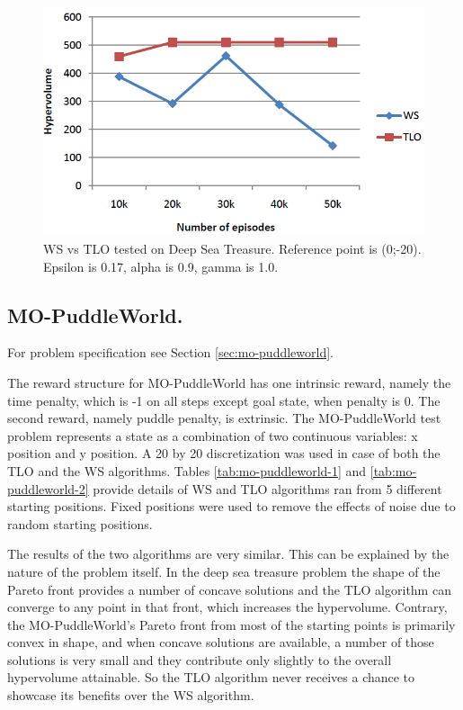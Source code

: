 \begin{figure}[ht]
\centering
\includegraphics[scale=0.6]{DSTResults.png}
\caption{WS vs TLO tested on Deep Sea Treasure. Reference point is (0;-20). Epsilon is 0.17, alpha is 0.9, gamma is 1.0.}
\label{fig:ws-tlo-dst-results}
\end{figure}

\subsection{MO-PuddleWorld.}
For problem specification see Section \ref{sec:mo-puddleworld}.

The reward structure for MO-PuddleWorld has one intrinsic reward, namely the time penalty, which is -1 on all steps except goal state, when penalty is 0. The second reward, namely puddle penalty, is extrinsic. The MO-PuddleWorld test problem represents a state as a combination of two continuous variables: x position and y position. A 20 by 20 discretization was used in case of both the TLO and the WS algorithms. Tables \ref{tab:mo-puddleworld-1} and \ref{tab:mo-puddleworld-2} provide details of WS and TLO algorithms ran from 5 different starting positions. Fixed positions were used to remove the effects of noise due to random starting positions.

The results of the two algorithms are very similar. This can be explained by the nature of the problem itself. In the deep sea treasure problem the shape of the Pareto front provides a number of concave solutions and the TLO algorithm can converge to any point in that front, which increases the hypervolume. Contrary, the MO-PuddleWorld's Pareto front from most of the starting points is primarily convex in shape, and when concave solutions are available, a number of those solutions is very small and they contribute only slightly to the overall hypervolume attainable. So the TLO algorithm never receives a chance to showcase its benefits over the WS algorithm.


